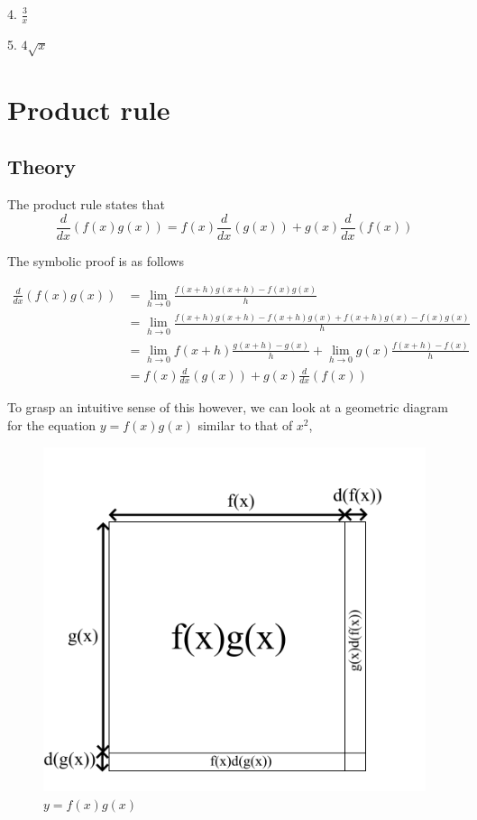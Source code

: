 \documentclass[a4paper,12pt,oneside]{book}
\begin{document}
4. $\frac{3}{x}$

5. $4\sqrt{x}$

\section{Product rule}

\subsection{Theory}

The product rule states that
$$\frac{d}{dx}(f(x)g(x))=f(x)\frac{d}{dx}(g(x))+g(x)\frac{d}{dx}(f(x))$$

\noindent The symbolic proof is as follows

$$
\begin{aligned}
\frac{d}{dx}(f(x)g(x))&=\lim_{h\to 0}\frac{f(x+h)g(x+h)-f(x)g(x)}{h}\\
&=\lim_{h\to 0}\frac{{f({x+h})g({x+h})-f({x+h})g(x)+f({x+h})g(x)-f(x)g(x)}}{h}\\
&=\lim_{h\to 0}f(x+h)\frac{g(x+h)-g(x)}{h}+\lim_{h\to 0}g(x)\frac{f(x+h)-f(x)}{h}\\
&=f(x)\frac{d}{dx}(g(x))+g(x)\frac{d}{dx}(f(x))
\end{aligned}
$$

\noindent To grasp an intuitive sense of this however, we can look at a geometric diagram for the equation $y=f(x)g(x)$ similar to that of $x^2$,

\begin{figure}[H]
    \begin{center}
        \includegraphics[scale=0.35]{img/zayan/prodrule.png}
        \caption{$y=f(x)g(x)$}
        \label{fig:prodrule}
    \end{center}
\end{figure}
\end{document}
